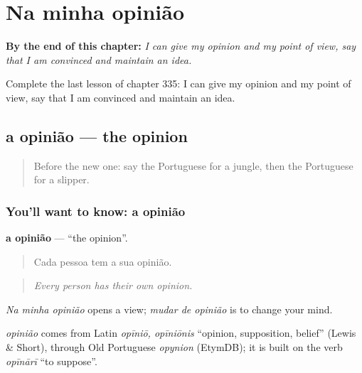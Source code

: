 
\chapter{Na minha opinião}
\label{ch:pt-na-minha-opiniao}

\begin{chapteropening}
\textbf{By the end of this chapter:} \emph{I can give my opinion and my point of view, say that I am convinced and maintain an idea.}

Complete the last lesson of chapter 335: I can give my opinion and my point of view, say that I am convinced and maintain an idea.
\end{chapteropening}

\section[a opinião]{a opinião — the opinion}

\label{lesson:PT-C335-opiniao}



\begin{quote}
Before the new one: say the Portuguese for a jungle, then the Portuguese for a slipper.
\end{quote}

\subsection*{You'll want to know: a opinião}
\textbf{a opinião} — \textquotedblleft{}the opinion\textquotedblright{}.

\begin{quote}
Cada pessoa tem a sua opinião.
\end{quote}

\begin{quote}
\emph{Every person has their own opinion.}
\end{quote}

\emph{Na minha opinião} opens a view; \emph{mudar de opinião} is to change your mind.

\begin{cousinweb}
\emph{opinião} comes from Latin \emph{opīniō, opīniōnis} \textquotedblleft{}opinion, supposition, belief\textquotedblright{} (Lewis \& Short), through Old Portuguese \emph{opynion} (EtymDB); it is built on the verb \emph{opīnārī} \textquotedblleft{}to suppose\textquotedblright{}.
\end{cousinweb}

